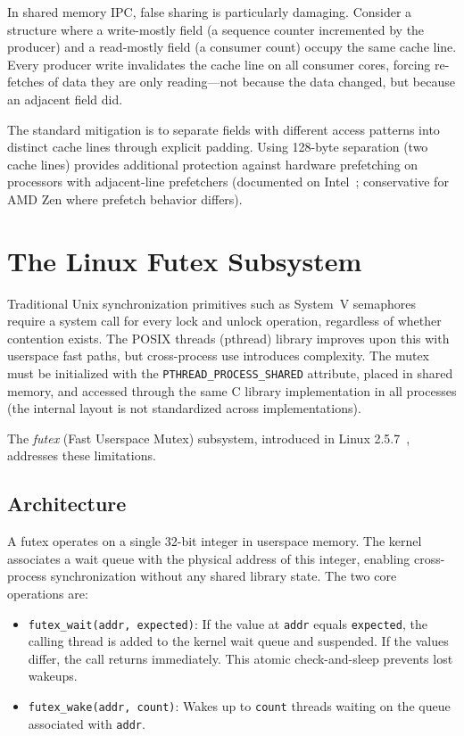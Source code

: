 In shared memory IPC, false sharing is particularly damaging. Consider a structure where a write-mostly field (a sequence counter incremented by the producer) and a read-mostly field (a consumer count) occupy the same cache line. Every producer write invalidates the cache line on all consumer cores, forcing re-fetches of data they are only reading---not because the data changed, but because an adjacent field did.

The standard mitigation is to separate fields with different access patterns into distinct cache lines through explicit padding. Using 128-byte separation (two cache lines) provides additional protection against hardware prefetching on processors with adjacent-line prefetchers (documented on Intel~\cite{intel_opt_manual}; conservative for AMD Zen where prefetch behavior differs).


\section{The Linux Futex Subsystem}
\label{sec:futex}

Traditional Unix synchronization primitives such as System~V semaphores require a system call for every lock and unlock operation, regardless of whether contention exists. The POSIX threads (pthread) library improves upon this with userspace fast paths, but cross-process use introduces complexity. The mutex must be initialized with the \texttt{PTHREAD\_\-PROCESS\_\-SHARED} attribute, placed in shared memory, and accessed through the same C library implementation in all processes (the internal layout is not standardized across implementations).

The \textit{futex} (Fast Userspace Mutex) subsystem, introduced in Linux 2.5.7~\cite{franke2002}, addresses these limitations.

\subsection{Architecture}

A futex operates on a single 32-bit integer in userspace memory. The kernel associates a wait queue with the physical address of this integer, enabling cross-process synchronization without any shared library state. The two core operations are:

\begin{itemize}
    \item \texttt{futex\_wait(addr, expected)}: If the value at \texttt{addr} equals \texttt{expected}, the calling thread is added to the kernel wait queue and suspended. If the values differ, the call returns immediately. This atomic check-and-sleep prevents lost wakeups.

    \item \texttt{futex\_wake(addr, count)}: Wakes up to \texttt{count} threads waiting on the queue associated with \texttt{addr}.
\end{itemize}

